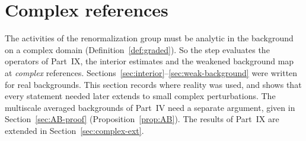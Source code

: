 \section{Complex references}\label{sec:complex-references}

The activities of the renormalization group must be analytic in the background on a complex domain (Definition~\ref{def:graded}). So the step evaluates the operators of Part~IX, the interior estimates and the weakened background map at \emph{complex} references. Sections~\ref{sec:interior}--\ref{sec:weak-background} were written for real backgrounds. This section records where reality was used, and shows that every statement needed later extends to small complex perturbations. The multiscale averaged backgrounds of Part~IV need a separate argument, given in Section~\ref{sec:AB-proof} (Proposition~\ref{prop:AB}). The results of Part~IX are extended in Section~\ref{sec:complex-ext}.

